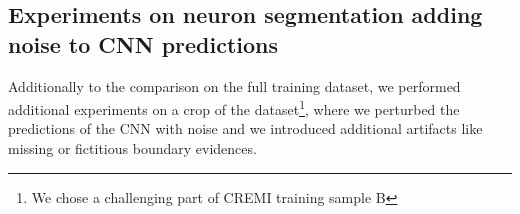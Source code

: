 

\subsection{Experiments on neuron segmentation adding noise to CNN predictions} \label{sec:appendix_noise_gen}
Additionally to the comparison on the full training dataset, we performed additional experiments on a crop of the dataset\footnote{We chose a challenging part of CREMI training sample B}, where we perturbed the predictions of the CNN with noise and we introduced additional artifacts like missing or fictitious boundary evidences.

